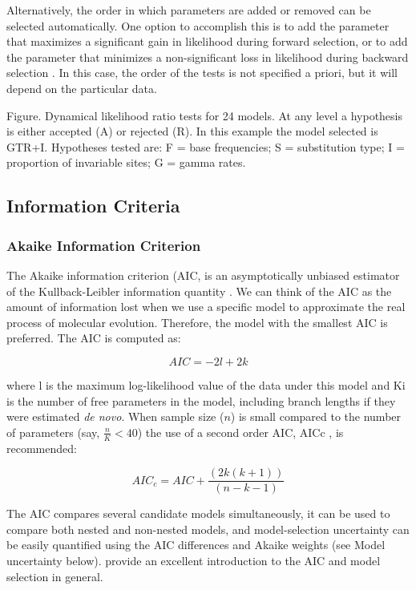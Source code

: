 Alternatively, the order in which parameters are added or removed can be selected automatically. One option to accomplish this is to add the parameter that maximizes a significant gain in likelihood during forward selection, or to add the parameter that minimizes a non-significant loss in likelihood during backward selection \citep{Posada-2001a}. In this case, the order of the tests is not specified a priori, but it will depend on the particular data.


Figure. Dynamical likelihood ratio tests for 24 models. At any level a hypothesis is either accepted (A) or rejected (R). In this example the model selected is GTR+I. Hypotheses tested are: F = base frequencies; S = substitution type; I = proportion of invariable sites; G = gamma rates.

\subsection{Information Criteria}
\subsubsection{Akaike Information Criterion}
\label{sec:aic}

The Akaike information criterion (AIC, \citep{Akaike-1974} is an asymptotically unbiased estimator of the Kullback-Leibler information quantity \citep{Kullback-1951}. We can think of the AIC as the amount of information lost when we use a specific model to approximate the real process of molecular evolution. Therefore, the model with the smallest AIC is preferred. The AIC is computed as:

\[
AIC=-2l+2k
\]

where l is the maximum log-likelihood value of the data under this model and Ki is the number of free parameters in the model, including branch lengths if they were estimated \emph{de novo}. When sample size ($n$) is small compared to the number of parameters (say, $\frac{n}{K} < 40$) the use of a second order AIC, AICc \citep{Sugiura-1978, Hurvich-1989}, is recommended:

\[
AIC_c=AIC+\frac{(2k(k+1))}{(n-k-1)}
\]

The AIC compares several candidate models simultaneously, it can be used to compare both nested and non-nested models, and model-selection uncertainty can be easily quantified using the AIC differences and Akaike weights (see Model uncertainty below). \citet{Burnham-2003} provide an excellent introduction to the AIC and model selection in general.

